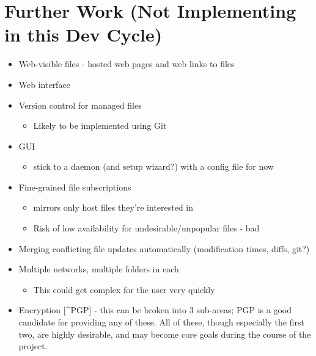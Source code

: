 \documentclass[12pt,a4paper,]{adreport}
\begin{document}
\chapter{Further Work (Not Implementing in this Dev
Cycle)}\label{further-work-not-implementing-in-this-dev-cycle}

\begin{itemize}
\itemsep1pt\parskip0pt
\item
  Web-visible files - hosted web pages and web links to files
\item
  Web interface
\item
  Version control for managed files

  \begin{itemize}
  \itemsep1pt\parskip0pt
  \item
    Likely to be implemented using Git
  \end{itemize}
\item
  GUI

  \begin{itemize}
  \itemsep1pt\parskip0pt
  \item
    stick to a daemon (and setup wizard?) with a config file for now
  \end{itemize}
\item
  Fine-grained file subscriptions

  \begin{itemize}
  \itemsep1pt\parskip0pt
  \item
    mirrors only host files they're interested in
  \item
    Risk of low availability for undesirable/unpopular files - bad
  \end{itemize}
\item
  Merging conflicting file updates automatically (modification times,
  diffs, git?)
\item
  Multiple networks, multiple folders in each

  \begin{itemize}
  \itemsep1pt\parskip0pt
  \item
    This could get complex for the user very quickly
  \end{itemize}
\item
  Encryption {[}\^{}PGP{]} - this can be broken into 3 sub-areas; PGP is
  a good candidate for providing any of these. All of these, though
  especially the first two, are highly desirable, and may become core
  goals during the course of the project.


\end{itemize}
\end{document}
